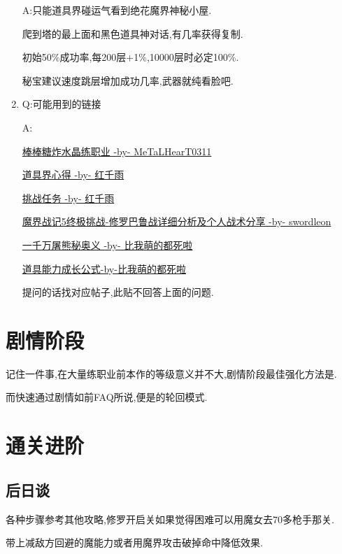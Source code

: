 \begin{enumerate}
	A:只能道具界碰运气看到绝花魔界神秘小屋.

	爬到塔的最上面和黑色道具神对话,有几率获得复制.

	初始50\%成功率,每200层+1\%,10000层时必定100\%.

	秘宝建议速度跳层增加成功几率,武器就纯看脸吧.

	\item
	Q:可能用到的链接

	A:

	\href{http://tieba.baidu.com/p/3717431968}{棒棒糖炸水晶练职业 -by- MeTaLHearT0311}

	\href{http://tieba.baidu.com/p/3730196003}{道具界心得 -by- 红千雨}

	\href{http://tieba.baidu.com/p/3723862919}{挑战任务 -by- 红千雨}

	\href{http://tieba.baidu.com/p/3949061316}{魔界战记5终极挑战-修罗巴鲁战详细分析及个人战术分享 -by- swordleon}

	\href{http://tieba.baidu.com/p/3825275063}{一千万屠熊秘奥义 -by- 比我萌的都死啦}

	\href{http://tieba.baidu.com/f?kz=3834692385}{道具能力成长公式-by-比我萌的都死啦}

	提问的话找对应帖子,此贴不回答上面的问题.

\end{enumerate}


\newpage

\section{剧情阶段}

记住一件事,在大量练职业前本作的等级意义并不大,剧情阶段最佳强化方法是{\color{red}{捕获+榨取+嗑药}}.

而快速通过剧情如前FAQ所说,便是{\color{red}{魔女+buff+(一触即发)+奥义捕捉+压榨+嗑药}}的轮回模式.

\newpage

\section{通关进阶}


	\subsection{后日谈}

	各种步骤参考其他攻略,修罗开启关如果觉得困难可以用魔女去70多枪手那关.

	带上减敌方回避的魔能力或者用魔界攻击破掉命中降低效果.

